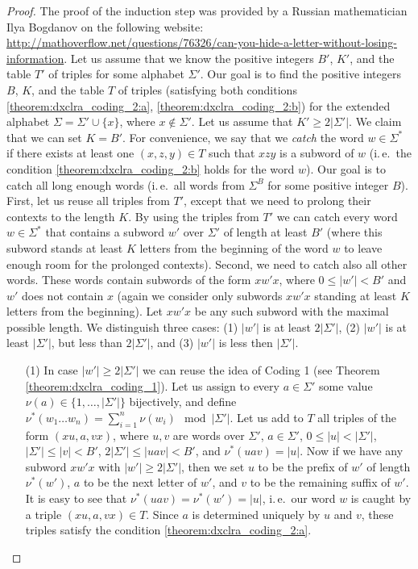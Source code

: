 \begin{proof}
The proof of the induction step was provided by a Russian mathematician Ilya Bogdanov on the following website: \url{http://mathoverflow.net/questions/76326/can-you-hide-a-letter-without-losing-information}. Let us assume that we know the positive integers $B'$, $K'$, and the table $T'$ of triples for some alphabet $\Sigma'$. Our goal is to find the positive integers $B$, $K$, and the table $T$ of triples (satisfying both conditions  \ref{theorem:dxclra_coding_2:a}, \ref{theorem:dxclra_coding_2:b}) for the extended alphabet $\Sigma = \Sigma' \cup \{x\}$, where $x \notin \Sigma'$. Let us assume that $K' \ge 2|\Sigma'|$. We claim that we can set $K = B'$. For convenience, we say that we \emph{catch} the word $w \in \Sigma^*$ if there exists at least one $(x, z, y) \in T$ such that $xzy$ is a subword of $w$ (i.\,e.\ the condition \ref{theorem:dxclra_coding_2:b} holds for the word $w$). Our goal is to catch all long enough words (i.\,e.\ all words from $\Sigma^B$ for some positive integer $B$). First, let us reuse all triples from $T'$, except that we need to prolong their contexts to the length $K$. By using the triples from $T'$ we can catch every word $w \in \Sigma^*$ that contains a subword $w'$ over $\Sigma'$ of  length at least $B'$ (where this subword stands at least $K$ letters from the beginning of the word $w$ to leave enough room for the prolonged contexts). Second, we need to catch also all other words. These words contain subwords of the form $xw'x$, where $0 \le |w'| < B'$ and $w'$ does not contain $x$ (again we consider only subwords $xw'x$ standing at least $K$ letters from the beginning). Let $xw'x$ be any such subword with the maximal possible length. We distinguish three cases: (1) $|w'|$ is at least $2 |\Sigma'|$, (2) $|w'|$ is at least $|\Sigma'|$, but less than  $2 |\Sigma'|$, and (3) $|w'|$ is less then $|\Sigma'|$.
\begin{enumerate}
\item[(1)] In case $|w'| \ge 2 |\Sigma'|$ we can reuse the idea of Coding 1 (see Theorem \ref{theorem:dxclra_coding_1}). Let us assign to every $a \in \Sigma'$ some value $\nu(a) \in \{1, \ldots, |\Sigma'|\}$ bijectively, and define $\nu^*(w_1 \ldots w_n) = \sum_{i = 1}^{n} \nu(w_i) \mod |\Sigma'|$. Let us add to $T$ all triples of the form $(xu, a, vx)$, where $u, v$ are words over $\Sigma'$, $a \in \Sigma'$, $0 \le |u| < |\Sigma'|$, $|\Sigma'| \le |v| < B'$, $2|\Sigma'| \le |uav| < B'$, and $\nu^*(uav) = |u|$. Now if we have any subword $xw'x$ with $|w'| \ge 2 |\Sigma'|$, then we set $u$ to be the prefix of $w'$ of length $\nu^*(w')$, $a$ to be the next letter of $w'$, and $v$ to be the remaining suffix of $w'$. It is easy to see that $\nu^*(uav) = \nu^*(w') = |u|$, i.\,e.\ our word $w$ is caught by a triple $(xu, a, vx) \in T$. Since $a$ is determined uniquely by $u$ and $v$, these triples satisfy the condition \ref{theorem:dxclra_coding_2:a}.

\end{enumerate}
\end{proof}
